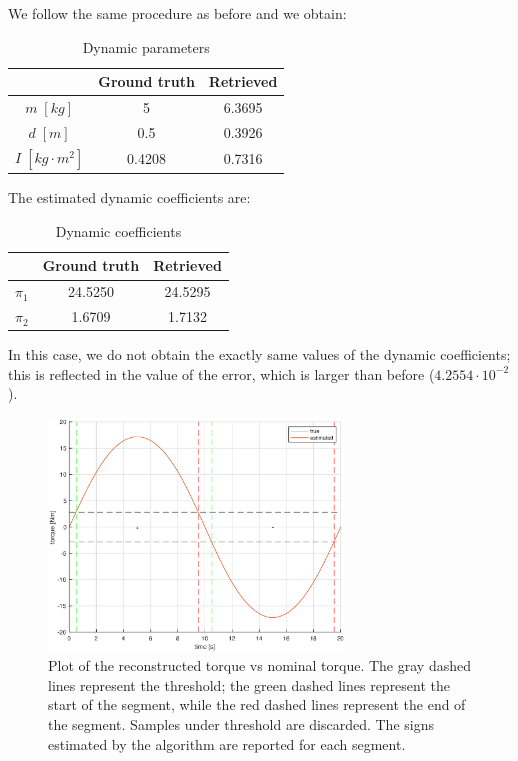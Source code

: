 \documentclass{article}
\begin{document}
We follow the same procedure as before and we obtain:

\begin{table}[!htbp]
\centering
\begin{tabular}{|c|cc|}
\hline
& Ground truth & Retrieved\\
\hline
$m\;[kg]$ & 5 & 6.3695\\ 
$d\;[m]$ & 0.5 & 0.3926\\
$I\;[kg\cdot m^2]$ & 0.4208 & 0.7316\\
\hline
\end{tabular}
\caption{Dynamic parameters}
\end{table}
\FloatBarrier

The estimated dynamic coefficients are:

\begin{table}[!htbp]
\centering
\begin{tabular}{|c|cc|}
\hline
& Ground truth & Retrieved\\
\hline
$\pi_1$ & 24.5250 & 24.5295\\ 
$\pi_2$ & 1.6709 & 1.7132\\
\hline
\end{tabular}
\caption{Dynamic coefficients}
\end{table}
\FloatBarrier

In this case, we do not obtain the exactly same values of the dynamic coefficients; this is reflected in the value of the error, which is larger than before ($4.2554 \cdot 10^{-2}$).

\begin{figure}[!htbp]
\centering
\includegraphics[width=0.7\textwidth]{images/1-dof/results2.eps}
\caption{Plot of the reconstructed torque vs nominal torque. The gray dashed lines represent the threshold; the green dashed lines represent the start of the segment, while the red dashed lines represent the end of the segment. Samples under threshold are discarded. The signs estimated by the algorithm are reported for each segment.}
\end{figure}
\FloatBarrier
\end{document}
